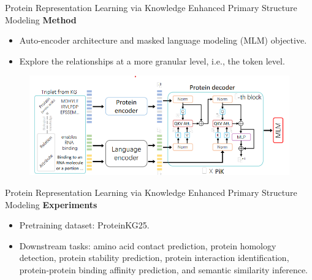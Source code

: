 \documentclass[notheorems, aspectratio=54]{beamer}
\begin{document}
\begin{frame}{Protein Representation Learning via Knowledge Enhanced Primary Structure Modeling}
  \textbf{Method}
  \begin{itemize}
      \item Auto-encoder architecture and masked language modeling (MLM) objective.
      \item Explore the relationships at a more granular level, i.e., the token level.
  \end{itemize}

  \begin{figure}[!h]
    \centering
    \includegraphics[width=1\linewidth]{figures/PRL-fig2.png}
  \end{figure}
\end{frame}


\begin{frame}{Protein Representation Learning via Knowledge Enhanced Primary Structure Modeling}
  \textbf{Experiments}
  \begin{itemize}
      \item Pretraining dataset: ProteinKG25.
      \item Downstream tasks: amino acid contact prediction, protein homology detection, protein stability prediction, protein interaction identification, protein-protein binding affinity prediction, and semantic similarity inference.
  \end{itemize}
\end{frame}
\end{document}
